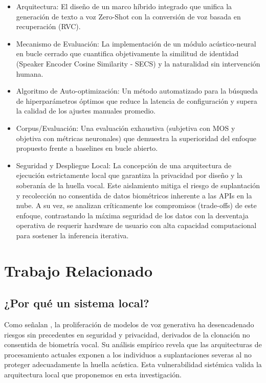 \documentclass[conference]{IEEEtran}
\begin{document}
\begin{itemize}
	\item Arquitectura: El diseño de un marco híbrido integrado que unifica la generación de texto a voz Zero-Shot con la conversión de voz basada en recuperación (RVC).
	
	\item Mecanismo de Evaluación: La implementación de un módulo acústico-neural en bucle cerrado que cuantifica objetivamente la similitud de identidad (Speaker Encoder Cosine Similarity - SECS) y la naturalidad sin intervención humana.
	
\item Algoritmo de Auto-optimización: Un método automatizado para la búsqueda de hiperparámetros óptimos que reduce la latencia de configuración y supera la calidad de los ajustes manuales promedio.
	
	\item Corpus/Evaluación: Una evaluación exhaustiva (subjetiva con MOS y objetiva con métricas neuronales) que demuestra la superioridad del enfoque propuesto frente a baselines en bucle abierto.

\item Seguridad y Despliegue Local: La concepción de una arquitectura de ejecución estrictamente local  que garantiza la privacidad por diseño y la soberanía de la huella vocal. Este aislamiento mitiga el riesgo de suplantación y recolección no consentida de datos biométricos inherente a las APIs en la nube. A su vez, se analizan críticamente los compromisos (trade-offs) de este enfoque, contrastando la máxima seguridad de los datos con la desventaja operativa de requerir hardware de usuario con alta capacidad computacional para sostener la inferencia iterativa.


\end{itemize}

\section{Trabajo Relacionado}

\subsection{¿Por qué un sistema local?}

Como señalan \cite{sharma2026voice}, la proliferación de modelos de voz generativa ha desencadenado riesgos sin precedentes en seguridad y privacidad, derivados de la clonación no consentida de biometría vocal. Su análisis empírico revela que las arquitecturas de procesamiento actuales exponen a los individuos a suplantaciones severas al no proteger adecuadamente la huella acústica. Esta vulnerabilidad sistémica valida la arquitectura local que proponemos en esta investigación. 
\end{document}

